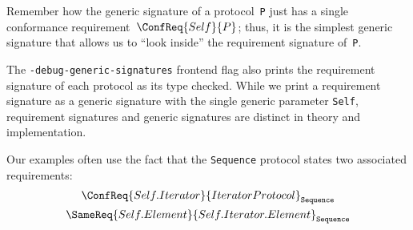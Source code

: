 \documentclass[../generics]{subfiles}
\begin{document}
Remember how the generic signature of a protocol~\texttt{P} just has a single conformance requirement~$\ConfReq{Self}{P}$; thus, it is the simplest generic signature that allows us to ``look inside'' the requirement signature of~\texttt{P}.

The \texttt{-debug-generic-signatures} frontend flag also prints the requirement signature of each protocol as its type checked. While we print a requirement signature as a generic signature with the single generic parameter \texttt{Self}, requirement signatures and generic signatures are distinct in theory and implementation.

Our examples often use the fact that the \texttt{Sequence} protocol states two associated requirements:
\begin{gather*}
\ConfReq{Self.Iterator}{IteratorProtocol}_\texttt{Sequence}\\
\SameReq{Self.Element}{Self.Iterator.Element}_\texttt{Sequence}
\end{gather*}
\end{document}
